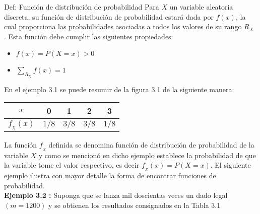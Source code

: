 \documentclass[base=hide,12pt]{elegantbook}
\begin{document}
\begin{Box4}{ Def: Función de distribución de probabilidad}%
Para $X$ un variable aleatoria discreta, su función de distribución de probabilidad estará dada por $f(x)$, la cual proporciona las probabilidades asociadas a todos los valores de su rango $R_{X}$ . Esta función debe cumplir las siguientes propiedades:\\

\begin{itemize}
	\item $f(x) = P(X=x) > 0$
	\item $\sum_{R_X} f(x) =1$
\end{itemize}
\end{Box4}

En el ejemplo 3.1 se puede resumir  de la figura 3.1  de la siguiente manera:

\begin{center}
	\begin{tabular}{c|cccc}
		$x$   & 0 &1 &2 &3 \\
		\hline 
		$f_{_{X}}(x)$&	 $1/8$ & $3/8$ & $3/8$ & $1/8$ \\
	\end{tabular}
\end{center}

La función $f_{_{X}}$ definida se denomina función de distribución de probabilidad de la variable $X$ y como se mencionó en dicho ejemplo establece	la probabilidad de que la variable tome el valor respectivo, es decir $f_{_{X}}(x)=P(X=x)$. El siguiente ejemplo ilustra con mayor detalle la forma de encontrar funciones de probabilidad.\\

\textcolor{col3}{\bf Ejemplo 3.2 :} 
Suponga que se lanza mil doscientas veces un dado legal  $(m=1200)$ y se obtienen los resultados consignados en la Tabla 3.1 

\end{document}
